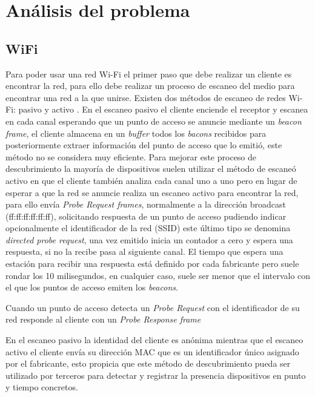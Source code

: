 \documentclass[../proyecto.tex]{subfiles}
\begin{document}
\chapter{Análisis del problema}
\section{WiFi}

Para poder usar una red Wi-Fi el primer paso que debe realizar un cliente es encontrar la red, para ello debe realizar un proceso de escaneo del medio para encontrar una red a la que unirse. Existen dos métodos de escaneo de redes Wi-Fi: pasivo y activo \cite{ieee80211_2016}. En el escaneo pasivo el cliente enciende el receptor y escanea en cada canal esperando que un punto de acceso se anuncie mediante un \textit{beacon frame}, el cliente almacena en un \textit{buffer} todos los \textit{bacons} recibidos para posteriormente extraer información del punto de acceso que lo emitió, este método no se considera muy eficiente. Para mejorar este proceso de descubrimiento la mayoría de dispositivos suelen utilizar el método de escaneó activo en que el cliente también analiza cada canal uno a uno pero en lugar de esperar a que la red se anuncie realiza un escaneo activo para encontrar la red, para ello envía \textit{Probe Request frames}, normalmente a la dirección broadcast (ff:ff:ff:ff:ff:ff), solicitando respuesta de un punto de acceso pudiendo indicar opcionalmente el identificador de la red (SSID) este último tipo se denomina \textit{directed probe request}, una vez emitido inicia un contador a cero y espera una respuesta, si no la recibe pasa al siguiente canal. El tiempo que espera una estación para recibir una respuesta está definido por cada fabricante pero suele rondar los 10 milisegundos, en cualquier caso, suele ser menor que el intervalo con el que los puntos de acceso emiten los \textit{beacons}.

Cuando un punto de acceso detecta un \textit{Probe Request} con el identificador de su red responde al cliente con un \textit{Probe Response frame}

En el escaneo pasivo la identidad del cliente es anónima mientras que el escaneo activo el cliente envía su dirección MAC que es un identificador único asignado por el fabricante, esto propicia que este método de descubrimiento pueda ser utilizado por terceros para detectar y registrar la presencia dispositivos en punto y tiempo concretos.
\end{document}
